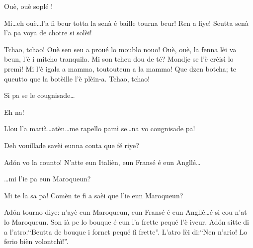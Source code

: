\begin{drama}

\Valletspeaks{} Ouè, ouè soplé !


\Prosperospeaks Mi\ldots eh ouè\ldots l'a fi beur totta la senà é baille tourna beur! Ren a fiye! Seutta senà l'a pa voya de chotre si solèi!

\Prosperospeaks{} Tchao, tchao! Ouè sen seu a proué lo moublo nouo! Ouè, ouè, la fenna lèi va beun, l'è i mitcho tranquila. Mi son tcheu dou de té? Mondje se l'è crèisì lo premì! Mi l'è igala a mamma, toutouteun a la mamma! Que dzen botcha; te queutto que la botèille l'è plèin-a. Tchao, tchao!


\Prosperospeaks{} Si pa se le cougnisade\ldots

\Valletspeaks Eh na!

\Prosperospeaks Llou l'a marià\ldots atèn\ldots me rapello pamì se\ldots na  vo cougnisade pa!


\Prosperospeaks{} Deh vouillade savèi eunna conta que fé riye?


\Prosperospeaks Ad\'on vo la counto! N’atte eun Italièn, eun Fransé é eun Angllé\ldots 

\Vetchotspeaks \ldots mi l'ie pa eun Maroqueun?

\Prosperospeaks Mi te la sa pa! Comèn te fi a saèi que l'ie eun Maroqueun?


\Prosperospeaks{} Ad\'on tourno diye: n'ayè eun Maroqueun, eun Fransé é eun Angllé\ldots é si cou n'at lo Maroqueun. Son ià pe lo bouque é eun l'a frette pequé l'è iveur. Ad\'on sitte di a l'atro:``Beutta de bouque i fornet pequé fi frette''. L'atro lèi di:``Nen n'ario! Lo ferio bièn volontchì!''.


\end{drama}
